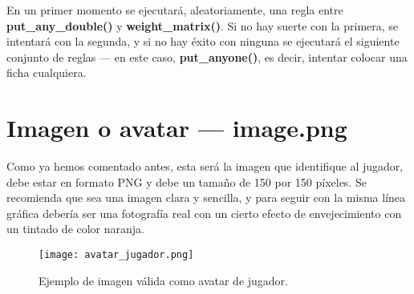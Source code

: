 En un primer momento se ejecutará, aleatoriamente, una regla entre \textbf{put\_any\_double()} y \textbf{weight\_matrix()}.
Si no hay suerte con la primera, se intentará con la segunda, y si no hay éxito con ninguna se ejecutará el siguiente
conjunto de reglas --- en este caso, \textbf{put\_anyone()}, es decir, intentar colocar una ficha cualquiera.


\section{Imagen o avatar --- image.png}

Como ya hemos comentado antes, esta será la imagen que identifique al jugador, debe estar en formato PNG y debe un tamaño
de 150 por 150 píxeles. Se recomienda que sea una imagen clara y sencilla, y para seguir con la misma línea gráfica debería
ser una fotografía real con un cierto efecto de envejecimiento con un tintado de color naranja.

\begin{figure}[h]
  \begin{center}
    \texttt{[image: avatar\_jugador.png]}
  \end{center}
  \caption{Ejemplo de imagen válida como avatar de jugador.}
  \label{fig:avatar_jugador}
\end{figure}

